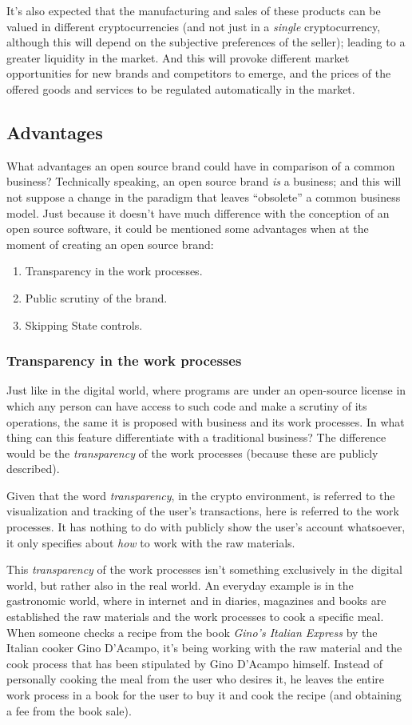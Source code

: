 \documentclass[12pt,a4paper]{article}
\begin{document}
It's also expected that the manufacturing and sales of these products can be valued in different cryptocurrencies (and not just in a \textit{single} cryptocurrency, although this will depend on the subjective preferences of the seller); leading to a greater liquidity in the market. And this will provoke different market opportunities for new brands and competitors to emerge, and the prices of the offered goods and services to be regulated automatically in the market.

\subsection{Advantages}
What advantages an open source brand could have in comparison of a common business? Technically speaking, an open source brand \textit{is} a business; and this will not suppose a change in the paradigm that leaves “obsolete” a common business model. Just because it doesn't have much difference with the conception of an open source software, it could be mentioned some advantages when at the moment of creating an open source brand:

\begin{enumerate}
\item Transparency in the work processes.
\item Public scrutiny of the brand.
\item Skipping State controls.
\end{enumerate}

\subsubsection{Transparency in the work processes}
Just like in the digital world, where programs are under an open-source license in which any person can have access to such code and make a scrutiny of its operations, the same it is proposed with business and its work processes. In what thing can this feature differentiate with a traditional business? The difference would be the \textit{transparency} of the work processes (because these are publicly described).

Given that the word \textit{transparency}, in the crypto environment, is referred to the visualization and tracking of the user's transactions, here is referred to the work processes. It has nothing to do with publicly show the user's account whatsoever, it only specifies about \textit{how} to work with the raw materials.

This \textit{transparency} of the work processes isn't something exclusively in the digital world, but rather also in the real world. An everyday example is in the gastronomic world, where in internet and in diaries, magazines and books are established the raw materials and the work processes to cook a specific meal. When someone checks a recipe from the book \textit{Gino's Italian Express} by the Italian cooker Gino D'Acampo, it's being working with the raw material and the cook process that has been stipulated by Gino D'Acampo himself. Instead of personally cooking the meal from the user who desires it, he leaves the entire work process in a book for the user to buy it and cook the recipe (and obtaining a fee from the book sale).
\end{document}
